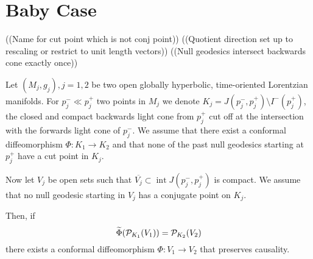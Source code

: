\section{Baby Case}
((Name for cut point which is not conj point))
((Quotient direction set up to rescaling or restrict to unit length vectors))
((Null geodesics intersect backwards cone exactly once))
\begin{theorem}\label{thm:babycase}
Let $(M_j,g_j), j=1,2$ be two open globally hyperbolic, time-oriented Lorentzian manifolds. For $p_j^-\ll p_j^+$ two points in $M_j$ we denote $K_j = J(p_j^-,p_j^+) \setminus I^-(p^+_j)$, the closed and compact backwards light cone from $p_j^+$ cut off at the intersection with the forwards light cone of $p_j^-$. We assume that there exist a conformal diffeomorphism $\Phi:K_1\to K_2$ and that none of the past null geodesics starting at $p_j^+$ have a cut point in $K_j$. 

Now let $V_j$ be open sets such that $\overline{V_j}\subset \operatorname{int} J(p_j^-,p_j^+)$ is compact. We assume that no null geodesic starting in $V_j$ has a conjugate point on $K_j$. 

Then, if 
\[
\widetilde{\Phi}(\mathcal{P}_{K_1}(V_1)) = \mathcal{P}_{K_2}(V_2)
\]
there exists a conformal diffeomorphism $\Phi:V_1\to V_2$ that preserves causality.
\end{theorem}

